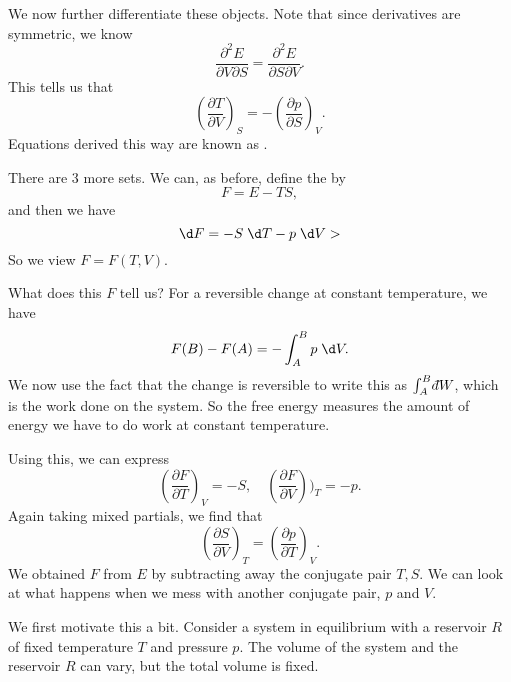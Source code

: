 \documentclass[a4paper]{article}
\def\di{{\mathchar'26\mkern-12mu d}}
\begin{document}
We now further differentiate these objects. Note that since derivatives are symmetric, we know
\[
  \frac{\partial^2 E}{\partial V\partial S} = \frac{\partial^2 E}{\partial S\partial V}.
\]
This tells us that
\[
  \left(\frac{\partial T}{\partial V}\right)_S = - \left(\frac{\partial p}{\partial S}\right)_V.
\]
Equations derived this way are known as .

There are $3$ more sets. We can, as before, define the  by
\[
  F = E - TS,
\]
and then we have
\[
  \d F = - S \;\d T - p \;\d V>
\]
So we view $F = F(T, V)$.

What does this $F$ tell us? For a reversible change at constant temperature, we have
\[
  F(B) - F(A) = - \int_A^B p \;\d V.
\]
We now use the fact that the change is reversible to write this as $\int_A^B \di W$, which is the work done on the system. So the free energy measures the amount of energy we have to do work at constant temperature.

Using this, we can express
\[
  \left(\frac{\partial F}{\partial T}\right)_V = - S,\quad \left(\frac{\partial F}{\partial V}\right))_T =- p.
\]
Again taking mixed partials, we find that
\[
  \left(\frac{\partial S}{\partial V}\right)_T = \left(\frac{\partial p}{\partial T}\right)_V.
\]
We obtained $F$ from $E$ by subtracting away the conjugate pair $T, S$. We can look at what happens when we mess with another conjugate pair, $p$ and $V$.

We first motivate this a bit. Consider a system in equilibrium with a reservoir $R$ of fixed temperature $T$ and pressure $p$. The volume of the system and the reservoir $R$ can vary, but the total volume is fixed.
\end{document}

